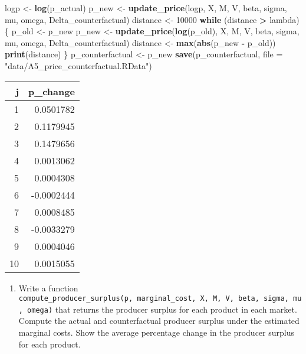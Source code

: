 \documentclass[
]{book}
\newenvironment{Shaded}{\begin{snugshade}}{\end{snugshade}}
\newcommand{\ControlFlowTok}[1]{\textcolor[rgb]{0.13,0.29,0.53}{\textbf{#1}}}
\newcommand{\DataTypeTok}[1]{\textcolor[rgb]{0.13,0.29,0.53}{#1}}
\newcommand{\DecValTok}[1]{\textcolor[rgb]{0.00,0.00,0.81}{#1}}
\newcommand{\KeywordTok}[1]{\textcolor[rgb]{0.13,0.29,0.53}{\textbf{#1}}}
\newcommand{\NormalTok}[1]{#1}
\newcommand{\OperatorTok}[1]{\textcolor[rgb]{0.81,0.36,0.00}{\textbf{#1}}}
\newcommand{\StringTok}[1]{\textcolor[rgb]{0.31,0.60,0.02}{#1}}
\providecommand{\tightlist}{%
  \setlength{\itemsep}{0pt}\setlength{\parskip}{0pt}}
\begin{document}
\begin{Shaded}
\begin{Highlighting}[]
\NormalTok{logp <-}\StringTok{ }\KeywordTok{log}\NormalTok{(p_actual)}
\NormalTok{p_new <-}\StringTok{ }\KeywordTok{update_price}\NormalTok{(logp, X, M, V, beta, sigma, mu, omega, Delta_counterfactual)}
\NormalTok{distance <-}\StringTok{ }\DecValTok{10000}
\ControlFlowTok{while}\NormalTok{ (distance }\OperatorTok{>}\StringTok{ }\NormalTok{lambda) \{}
\NormalTok{  p_old <-}\StringTok{ }\NormalTok{p_new}
\NormalTok{  p_new <-}\StringTok{ }\KeywordTok{update_price}\NormalTok{(}\KeywordTok{log}\NormalTok{(p_old), X, M, V, beta, sigma, mu, omega, Delta_counterfactual)}
\NormalTok{  distance <-}\StringTok{ }\KeywordTok{max}\NormalTok{(}\KeywordTok{abs}\NormalTok{(p_new }\OperatorTok{-}\StringTok{ }\NormalTok{p_old))}
  \KeywordTok{print}\NormalTok{(distance)}
\NormalTok{\}}
\NormalTok{p_counterfactual <-}\StringTok{ }\NormalTok{p_new}
\KeywordTok{save}\NormalTok{(p_counterfactual, }\DataTypeTok{file =} \StringTok{"data/A5_price_counterfactual.RData"}\NormalTok{)}
\end{Highlighting}
\end{Shaded}

\begin{tabular}{r|r}
\hline
j & p\_change\\
\hline
1 & 0.0501782\\
\hline
2 & 0.1179945\\
\hline
3 & 0.1479656\\
\hline
4 & 0.0013062\\
\hline
5 & 0.0004308\\
\hline
6 & -0.0002444\\
\hline
7 & 0.0008485\\
\hline
8 & -0.0033279\\
\hline
9 & 0.0004046\\
\hline
10 & 0.0015055\\
\hline
\end{tabular}

\begin{enumerate}
\def\labelenumi{\arabic{enumi}.}
\setcounter{enumi}{2}
\tightlist
\item
  Write a function \texttt{compute\_producer\_surplus(p,\ marginal\_cost,\ X,\ M,\ V,\ beta,\ sigma,\ mu,\ omega)} that returns the producer surplus for each product in each market. Compute the actual and counterfactual producer surplus under the estimated marginal costs. Show the average percentage change in the producer surplus for each product.
\end{enumerate}
\end{document}
